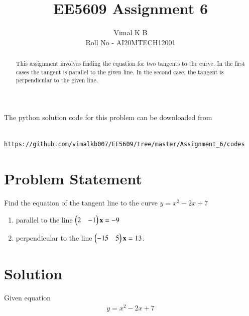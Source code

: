 \documentclass[journal,12pt,twocolumn]{IEEEtran}
\begin{document}
	
	
	\title{EE5609 Assignment 6}
	\author{Vimal K B \\Roll No - AI20MTECH12001}
	
	\maketitle
	\newpage
	\bigskip
	
	\renewcommand{\thefigure}{\theenumi}
	\renewcommand{\thetable}{\theenumi}
	
	\begin{abstract}
		This assignment involves finding the equation for two tangents to the curve. In the first cases the tangent is parallel to the given line. In the second case, the tangent is perpendicular to the given line.
	\end{abstract}
	
The python solution code for this problem can be downloaded from

\begin{lstlisting}
	https://github.com/vimalkb007/EE5609/tree/master/Assignment_6/codes
\end{lstlisting}
	
	\section{Problem Statement}
	Find the equation of the tangent line to the curve $y = x^2-2x+7$
	
	\begin{enumerate}
		\item  parallel to the line $\begin{pmatrix}2 & -1\end{pmatrix}\mathbf{x}= -9$ 
		\item  perpendicular to the line $\begin{pmatrix}-15 & 5\end{pmatrix}\mathbf{x} = 13$.
	\end{enumerate}
	 
	
	\section{Solution}
		Given equation 
		\begin{align} \label{eq:fact1}
			y = x^2-2x+7
		\end{align}
	
\end{document}
